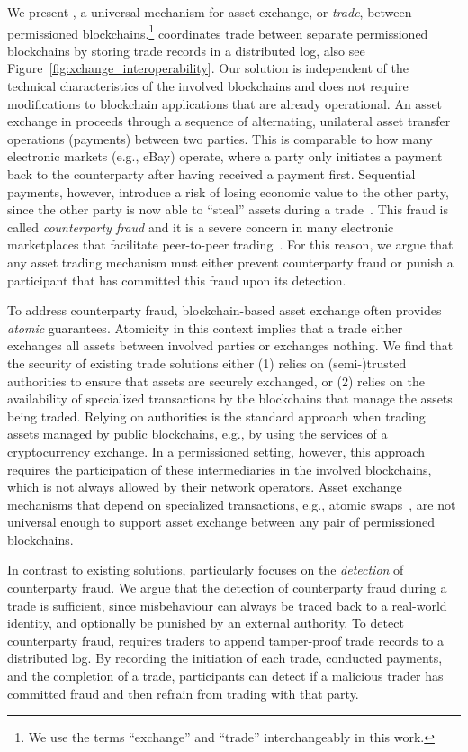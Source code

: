 We present \emph{\ModelName{}}, a universal mechanism for asset exchange, or \emph{trade}, between permissioned blockchains.\footnote{We use the terms \enquote{exchange} and \enquote{trade} interchangeably in this work.}
\ModelName{} coordinates trade between separate permissioned blockchains by storing trade records in a distributed log, also see Figure~\ref{fig:xchange_interoperability}.
Our solution is independent of the technical characteristics of the involved blockchains and does not require modifications to blockchain applications that are already operational.
An asset exchange in \ModelName{} proceeds through a sequence of alternating, unilateral asset transfer operations (payments) between two parties.
This is comparable to how many electronic markets (e.g., eBay) operate, where a party only initiates a payment back to the counterparty after having received a payment first.
Sequential payments, however, introduce a risk of losing economic value to the other party, since the other party is now able to \enquote{steal} assets during a trade~\cite{koens2019assessing}.
This fraud is called \emph{counterparty fraud} and it is a severe concern in many electronic marketplaces that facilitate peer-to-peer trading~\cite{peters2016understanding}.
For this reason, we argue that any asset trading mechanism must either prevent counterparty fraud or punish a participant that has committed this fraud upon its detection.

To address counterparty fraud, blockchain-based asset exchange often provides \emph{atomic} guarantees.
Atomicity in this context implies that a trade either exchanges all assets between involved parties or exchanges nothing.
We find that the security of existing trade solutions either (1) relies on (semi-)trusted authorities to ensure that assets are securely exchanged, or (2) relies on the availability of specialized transactions by the blockchains that manage the assets being traded.
Relying on authorities is the standard approach when trading assets managed by public blockchains, e.g., by using the services of a cryptocurrency exchange.
In a permissioned setting, however, this approach requires the participation of these intermediaries in the involved blockchains, which is not always allowed by their network operators.
Asset exchange mechanisms that depend on specialized transactions, e.g., atomic swaps~\cite{nolan2016atomic}, are not universal enough to support asset exchange between any pair of permissioned blockchains.

In contrast to existing solutions, \ModelName{} particularly focuses on the \emph{detection} of counterparty fraud.
We argue that the detection of counterparty fraud during a trade is sufficient, since misbehaviour can always be traced back to a real-world identity, and optionally be punished by an external authority.
To detect counterparty fraud, \ModelName{} requires traders to append tamper-proof trade records to a distributed log.
By recording the initiation of each trade, conducted payments, and the completion of a trade, participants can detect if a malicious trader has committed fraud and then refrain from trading with that party.

